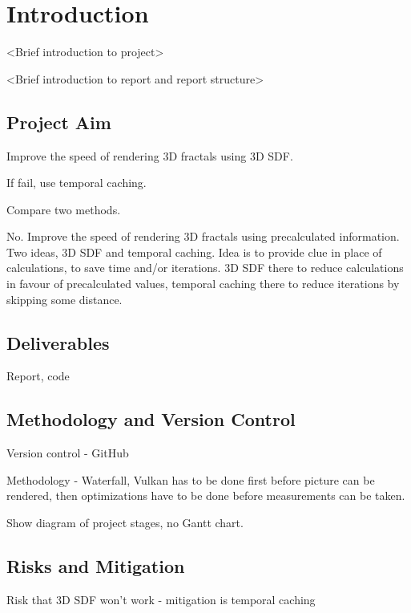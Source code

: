 \chapter{Introduction}
\label{chapter1}

<Brief introduction to project>

<Brief introduction to report and report structure>

\section{Project Aim}

Improve the speed of rendering 3D fractals using 3D SDF.

If fail, use temporal caching.

Compare two methods.

No. Improve the speed of rendering 3D fractals using precalculated information. Two ideas, 3D SDF and temporal caching. Idea is to provide clue in place of calculations, to save time and/or iterations. 3D SDF there to reduce calculations in favour of precalculated values, temporal caching there to reduce iterations by skipping some distance.

\section{Deliverables}

Report, code

\section{Methodology and Version Control}

Version control - GitHub

Methodology - Waterfall, Vulkan has to be done first before picture can be rendered, then optimizations have to be done before measurements can be taken.

Show diagram of project stages, no Gantt chart.

\section{Risks and Mitigation}

Risk that 3D SDF won't work - mitigation is temporal caching